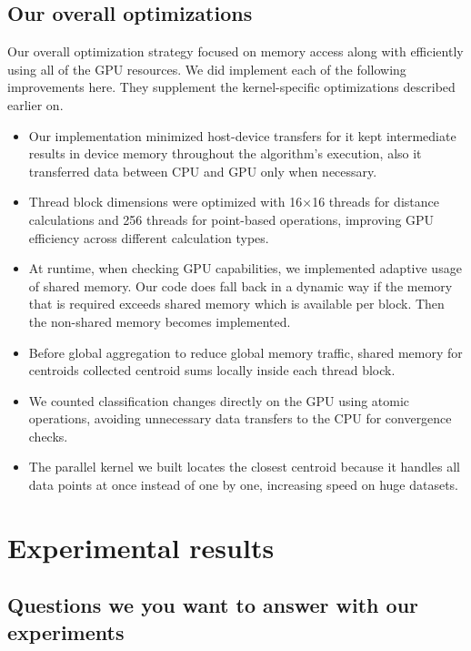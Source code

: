 \documentclass[sigconf]{acmart}
\begin{document}
\subsection{Our overall optimizations}
Our overall optimization strategy focused on memory access along with efficiently using all of the GPU resources. We did implement each of the following improvements here. They supplement the kernel-specific optimizations described earlier on.
\begin{itemize}
    \item Our implementation minimized host-device transfers for it kept intermediate results in device memory throughout the algorithm's execution, also it transferred data between CPU and GPU only when necessary.
    \item Thread block dimensions were optimized with 16×16 threads for distance calculations and 256 threads for point-based operations, improving GPU efficiency across different calculation types.
    \item At runtime, when checking GPU capabilities, we implemented adaptive usage of shared memory. Our code does fall back in a dynamic way if the memory that is required exceeds shared memory which is available per block. Then the non-shared memory becomes implemented.
    \item Before global aggregation to reduce global memory traffic, shared memory for centroids collected centroid sums locally inside each thread block.
    \item We counted classification changes directly on the GPU using atomic operations, avoiding unnecessary data transfers to the CPU for convergence checks.
    \item The parallel kernel we built locates the closest centroid because it handles all data points at once instead of one by one, increasing speed on huge datasets.
\end{itemize}


\section{Experimental results}

\subsection{Questions we you want to answer with our experiments}
\end{document}
